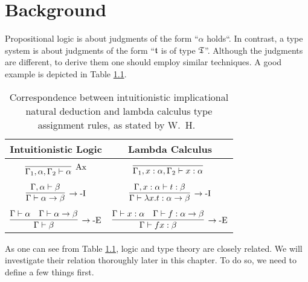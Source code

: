 \chapter{Background}\label{chap:background}

Propositional logic is about judgments of the form ``$\alpha$ holds``. In contrast, a type system is about judgments of the form ``$\mathfrak{t}$ is of type $\mathfrak{T}$''. Although the judgments are different, to derive them one should employ similar techniques. A good example is depicted in Table \ref{tab:natural-deduction-lambda-calculus-correspondence}.

\begin{table}[!ht]
    \centering
    \begin{tabular}{c|c}
        Intuitionistic Logic & Lambda Calculus \\
        \hline \\
        $\infer[\mbox{Ax}]{\Gamma_1, \alpha, \Gamma_2 \vdash \alpha}{}$ & $\infer[]{\Gamma_1, x : \alpha, \Gamma_2 \vdash x : \alpha}{}$ \\ \\
        $\infer[\rightarrow\mbox{-I}]{\Gamma \vdash \alpha \rightarrow \beta}{\Gamma, \alpha \vdash \beta}$ & $\infer[\rightarrow\mbox{-I}]{\Gamma \vdash \lambda x. t : \alpha \rightarrow \beta}{\Gamma, x : \alpha \vdash t : \beta}$ \\ \\
        $\infer[\rightarrow\mbox{-E}]{\Gamma \vdash \beta}{\Gamma \vdash \alpha & \Gamma \vdash \alpha \rightarrow \beta}$ & $\infer[\rightarrow\mbox{-E}]{\Gamma \vdash f x : \beta}{\Gamma \vdash x : \alpha & \Gamma \vdash f : \alpha \rightarrow \beta}$
    \end{tabular}
    \caption{Correspondence between 
intuitionistic implicational natural deduction and lambda calculus type assignment rules, as stated by W.~H.~\cite{Howard1969TheFN}}
    \label{tab:natural-deduction-lambda-calculus-correspondence}
\end{table}

As one can see from Table \ref{tab:natural-deduction-lambda-calculus-correspondence}, logic and type theory are closely related. We will investigate their relation thoroughly later in this chapter. To do so, we need to define a few things first.









